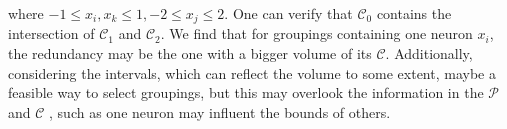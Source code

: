 \documentclass[runningheads]{llncs}
\begin{document}

where $-1 \leq x_{i},x_{k}\leq 1, -2\leq x_{j}\leq 2$. One can verify that $\mathcal{C}_{0}$ contains the intersection of $\mathcal{C}_{1}$ and $\mathcal{C}_{2}$. We find that for groupings containing one neuron $x_{i}$, the redundancy may be the one with a bigger volume of its $\mathcal{C}$. Additionally, considering the intervals, which can reflect the volume to some extent, maybe a feasible way to select groupings, but this may overlook the information in the $\mathcal{P}$ and $\mathcal{C}$ , such as one neuron may influent the bounds of others.
\end{document}
